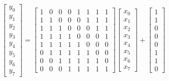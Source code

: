 \documentclass[11pt,journal,compsoc, onecolumn]{IEEEtran}
\begin{document}
\begin{equation}\label{eq:affine}
	\begin{bmatrix}
		y_0 \\
		y_1 \\
		y_2 \\
		y_3 \\
		y_4 \\
		y_5 \\
		y_6 \\
		y_7 
	\end{bmatrix}
	=
	\begin{bmatrix}
		1 & 0 & 0 & 0 & 1 & 1 & 1 & 1 \\
		1 & 1 & 0 & 0 & 0 & 1 & 1 & 1 \\
		1 & 1 & 1 & 0 & 0 & 0 & 1 & 1 \\
		1 & 1 & 1 & 1 & 0 & 0 & 0 & 1 \\
		1 & 1 & 1 & 1 & 1 & 0 & 0 & 0 \\
		0 & 1 & 1 & 1 & 1 & 1 & 0 & 0 \\
		0 & 0 & 1 & 1 & 1 & 1 & 1 & 0 \\
		0 & 0 & 0 & 1 & 1 & 1 & 1 & 1 
	\end{bmatrix}
	\begin{bmatrix}
		x_0 \\
		x_1 \\
		x_2 \\
		x_3 \\
		x_4 \\
		x_5 \\
		x_6 \\
		x_7 
	\end{bmatrix}
	+
	\begin{bmatrix}
		1 \\
		1 \\
		0 \\
		0 \\
		0 \\
		1 \\
		1 \\
		0 
	\end{bmatrix}
\end{equation}	
\end{document}

